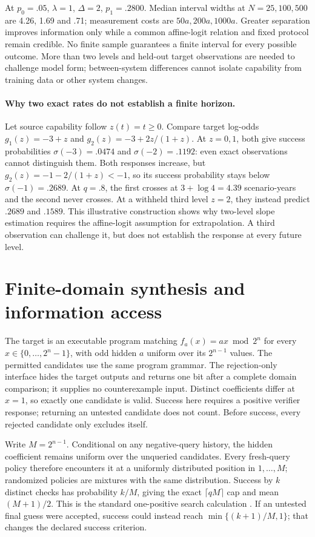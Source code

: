 At $p_0=.05$, $\lambda=1$, $\Delta=2$, $p_1=.2800$. Median interval widths at $N=25,100,500$ are 4.26, 1.69 and .71; measurement costs are $50a,200a,1000a$. Greater separation improves information only while a common affine-logit relation and fixed protocol remain credible. No finite sample guarantees a finite interval for every possible outcome. More than two levels and held-out target observations are needed to challenge model form; between-system differences cannot isolate capability from training data or other system changes.

\paragraph{Why two exact rates do not establish a finite horizon.}
\label{app:twolevelboundary}
Let source capability follow $z(t)=t\ge0$. Compare target log-odds $g_1(z)=-3+z$ and $g_2(z)=-3+2z/(1+z)$. At $z=0,1$, both give success probabilities $\sigma(-3)=.0474$ and $\sigma(-2)=.1192$: even exact observations cannot distinguish them. Both responses increase, but $g_2(z)=-1-2/(1+z)<-1$, so its success probability stays below $\sigma(-1)=.2689$. At $q=.8$, the first crosses at $3+\log4=4.39$ scenario-years and the second never crosses. At a withheld third level $z=2$, they instead predict $.2689$ and $.1589$. This illustrative construction shows why two-level slope estimation requires the affine-logit assumption for extrapolation. A third observation can challenge it, but does not establish the response at every future level.

\section{Finite-domain synthesis and information access}
\label{app:synthesis}
The target is an executable program matching $f_a(x)=ax\bmod 2^n$ for every $x\in\{0,\ldots,2^n-1\}$, with odd hidden $a$ uniform over its $2^{n-1}$ values. The permitted candidates use the same program grammar. The rejection-only interface hides the target outputs and returns one bit after a complete domain comparison; it supplies no counterexample input. Distinct coefficients differ at $x=1$, so exactly one candidate is valid. Success here requires a positive verifier response; returning an untested candidate does not count. Before success, every rejected candidate only excludes itself.

Write $M=2^{n-1}$. Conditional on any negative-query history, the hidden coefficient remains uniform over the unqueried candidates. Every fresh-query policy therefore encounters it at a uniformly distributed position in $1,\ldots,M$; randomized policies are mixtures with the same distribution. Success by $k$ distinct checks has probability $k/M$, giving the exact $\lceil qM\rceil$ cap and mean $(M+1)/2$. This is the standard one-positive search calculation \citep[cf.\ Example~2]{russo2013}. If an untested final guess were accepted, success could instead reach $\min\{(k+1)/M,1\}$; that changes the declared success criterion.

